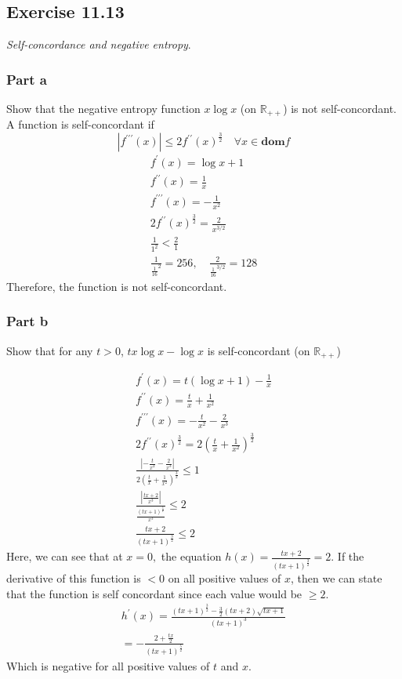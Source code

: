 \subsection{Exercise 11.13} 
\textit{Self-concordance and negative entropy}.
\subsubsection{Part a}
Show that the negative entropy function $x \log x$ (on $\mathbb{R}_{++}$) is not self-concordant. \\
A function is self-concordant if 
\begin{equation}
    |f^{\prime \prime \prime}(x) | \leq 2 f^{\prime \prime} (x)^{\frac{3}{2}} \quad \forall x \in \textbf{dom} f
\end{equation}
\begin{gather}
    f^{\prime}(x) = \log x + 1 \\
    f^{\prime \prime}(x) = \frac{1}{x} \\
    f^{\prime \prime \prime}(x) = - \frac{1}{x^2} \\ 
    2 f^{\prime \prime} (x)^{\frac{3}{2}} = \frac{2}{x^{3/2}} \\
    \frac{1}{1^2} < \frac{2}{1} \\ 
    \frac{1}{\frac{1}{16}^2} = 256, \quad \frac{2}{\frac{1}{16}^{3/2}} = 128
\end{gather} 
Therefore, the function is not self-concordant.

\subsubsection{Part b}
Show that for any $t > 0$, $tx \log x - \log x $ is self-concordant (on $\mathbb{R}_{++}$)

\begin{gather}
    f^{\prime}(x) = t(\log x + 1) - \frac{1}{x} \\
    f^{\prime \prime}(x) = \frac{t}{x} + \frac{1}{x^2} \\
    f^{\prime \prime \prime}(x) = -\frac{t}{x^2} - \frac{2}{x^3} \\ 
    2 f^{\prime \prime} (x)^{\frac{3}{2}} = 2(\frac{t}{x} + \frac{1}{x^2})^\frac{3}{2} \\
    \frac{|-\frac{t}{x^2} - \frac{2}{x^3}|}{2(\frac{t}{x} + \frac{1}{x^2})^\frac{3}{2}} \leq 1 \\ 
    \frac{|\frac{tx+2}{x^3}|}{\frac{(tx+1)^\frac{3}{2}}{x^3}} \leq 2 \\
    \frac{tx+2}{(tx+1)^\frac{3}{2}} \leq 2
\end{gather} 
Here, we can see that at $ x= 0,$ the equation $h(x) = \frac{tx+2}{(tx+1)^\frac{3}{2}} = 2$. If the derivative of this function is $<0$ on all positive values of $x$, then we can state that the function is self concordant since each value would be $\geq 2$.
\begin{gather}
    h^\prime (x) = \frac{(tx+1)^\frac{3}{2} - \frac{3}{2}(tx+2) \sqrt{tx+1}}{(tx+1)^3} \\
    = - \frac{2+\frac{tx}{2}}{(tx+1)^\frac{5}{2}}
\end{gather}
Which is negative for all positive values of $t$ and $x$.


